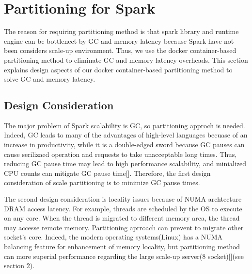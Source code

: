 \section{Partitioning for Spark}

The reason for requiring partitioning method is that
spark library and runtime engine can be bottlenect by GC and memory latency
because Spark have not been considers scale-up environment.
Thus, we use the docker container-based partitioning method to eliminate GC and
memory latency overheads. 
This section explains design aspects of our docker container-based
partitioning method to solve GC and memory latency.

\subsection{Design Consideration}

The major problem of Spark scalability is GC, so partitioning approch is needed.
Indeed, GC leads to many of the advantages of high-level languages becuase of
an increase in productivity, while it is a double-edged sword because
GC pauses can cause serilizaed operation and requests to take unacceptable long
times.
Thus, reducing GC pause time may lead to high performance scalability,
and minialized CPU counts can mitigate GC pause time[].
Therefore, the first design consideration of scale partitioning is to minimize GC
pause times.

The second design consideration is locality issues because of NUMA archtecture
DRAM access latency.
For example, threads are scheduled by the OS to execute on any core. When
the thread is migrated to different memory area, the thread may accesse
remote memory.
Partitioning aprroach can prevent to migrate other socket's core.
Indeed, the modern operating systems(Linux) has a NUMA balancing feature for
enhancement of memory locality, but partitioning method can more superial
performance regarding the large scale-up server(8 socket)[](see section 2).

